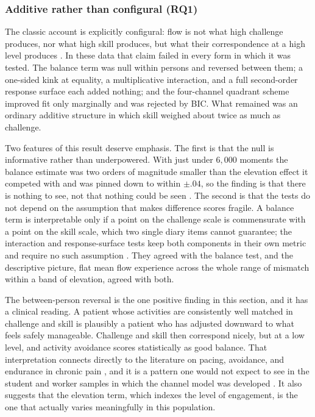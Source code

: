 \documentclass[11pt,a4paper]{article}
\begin{document}
\subsubsection{Additive rather than configural (RQ1)}
The classic account is explicitly configural: flow is not what high challenge produces, nor what
high skill produces, but what their correspondence at a high level produces
\citep{csikszentmihalyi1990flow,massimini1988systematic}. In these data that claim failed in every
form in which it was tested. The balance term was null within persons and reversed between them; a
one-sided kink at equality, a multiplicative interaction, and a full second-order response surface
each added nothing; and the four-channel quadrant scheme improved fit only marginally and was
rejected by BIC. What remained was an ordinary additive structure in which skill weighed about
twice as much as challenge.

Two features of this result deserve emphasis. The first is that the null is informative rather than
underpowered. With just under $6{,}000$ moments the balance estimate was two orders of magnitude
smaller than the elevation effect it competed with and was pinned down to within $\pm.04$, so the
finding is that there is nothing to see, not that nothing could be seen
\citep{lakens2018equivalence}. The second is that the tests do not depend on the assumption that
makes difference scores fragile. A balance term is interpretable only if a point on the challenge
scale is commensurate with a point on the skill scale, which two single diary items cannot
guarantee; the interaction and response-surface tests keep both components in their own metric and
require no such assumption \citep{edwards1993polynomial,edwards1994congruence}. They agreed with
the balance test, and the descriptive picture, flat mean flow experience across the whole range of
mismatch within a band of elevation, agreed with both.

The between-person reversal is the one positive finding in this section, and it has a clinical
reading. A patient whose activities are consistently well matched in challenge and skill is
plausibly a patient who has adjusted downward to what feels safely manageable. Challenge and skill
then correspond nicely, but at a low level, and activity avoidance scores statistically as good
balance. That interpretation connects directly to the literature on pacing, avoidance, and
endurance in chronic pain \citep{andrews2012activity,vlaeyen2000fear}, and it is a pattern one
would not expect to see in the student and worker samples in which the channel model was developed
\citep{carli1988quality}. It also suggests that the elevation term, which indexes the level of
engagement, is the one that actually varies meaningfully in this population.
\end{document}
